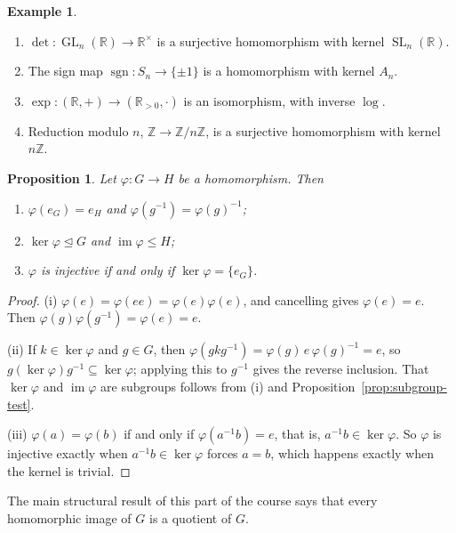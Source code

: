 \documentclass[11pt]{article}
\theoremstyle{plain}
\newtheorem{proposition}[theorem]{Proposition}
\theoremstyle{definition}
\newtheorem{example}[theorem]{Example}
\theoremstyle{remark}
\newcommand{\Z}{\mathbb{Z}}
\newcommand{\R}{\mathbb{R}}
\DeclareMathOperator{\im}{im}
\DeclareMathOperator{\GL}{GL}
\DeclareMathOperator{\SL}{SL}
\DeclareMathOperator{\sgn}{sgn}
\begin{document}
\begin{example}\label{ex:homs}
\leavevmode
\begin{enumerate}[label=(\alph*)]
  \item $\det\colon \GL_n(\R) \to \R^\times$ is a surjective homomorphism with kernel $\SL_n(\R)$.
  \item The sign map $\sgn\colon S_n \to \{\pm 1\}$ is a homomorphism with kernel $A_n$.
  \item $\exp\colon (\R, +) \to (\R_{>0}, \cdot)$ is an isomorphism, with inverse $\log$.
  \item Reduction modulo $n$, $\Z \to \Z/n\Z$, is a surjective homomorphism with kernel $n\Z$.
\end{enumerate}
\end{example}

\begin{proposition}\label{prop:hom-basic}
Let $\varphi\colon G \to H$ be a homomorphism. Then
\begin{enumerate}[label=\textup{(\roman*)}]
  \item $\varphi(e_G) = e_H$ and $\varphi(g^{-1}) = \varphi(g)^{-1}$;
  \item $\ker\varphi \trianglelefteq G$ and $\im\varphi \le H$;
  \item $\varphi$ is injective if and only if $\ker\varphi = \{e_G\}$.
\end{enumerate}
\end{proposition}

\begin{proof}
(i) $\varphi(e) = \varphi(ee) = \varphi(e)\varphi(e)$, and cancelling gives $\varphi(e) = e$. Then $\varphi(g)\varphi(g^{-1}) = \varphi(e) = e$.

(ii) If $k \in \ker\varphi$ and $g \in G$, then $\varphi(gkg^{-1}) = \varphi(g)\,e\,\varphi(g)^{-1} = e$, so $g(\ker\varphi)g^{-1} \subseteq \ker\varphi$; applying this to $g^{-1}$ gives the reverse inclusion. That $\ker\varphi$ and $\im\varphi$ are subgroups follows from (i) and Proposition~\ref{prop:subgroup-test}.

(iii) $\varphi(a) = \varphi(b)$ if and only if $\varphi(a^{-1}b) = e$, that is, $a^{-1}b \in \ker\varphi$. So $\varphi$ is injective exactly when $a^{-1}b \in \ker\varphi$ forces $a = b$, which happens exactly when the kernel is trivial.
\end{proof}

The main structural result of this part of the course says that every homomorphic image of $G$ is a quotient of $G$.
\end{document}
